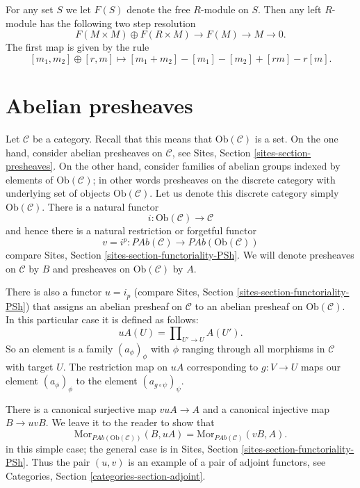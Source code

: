 \medskip\noindent
For any set $S$ we let $F(S)$ denote the free $R$-module on $S$.
Then any left $R$-module has the following two step resolution
$$
F(M\times M) \oplus F(R\times M) \to F(M) \to M \to 0.
$$
The first map is given by the rule
$$
[m_1, m_2] \oplus [r, m] \mapsto [m_1 + m_2] - [m_1] - [m_2] + [rm] - r[m].
$$


\section{Abelian presheaves}
\label{section-injectives-presheaves}

\noindent
Let $\mathcal{C}$ be a category. Recall that this means that
$\text{Ob}(\mathcal{C})$ is a set. On the one hand, consider abelian
presheaves on $\mathcal{C}$, see
Sites, Section \ref{sites-section-presheaves}.
On the other hand, consider families of abelian groups
indexed by elements of $\text{Ob}(\mathcal{C})$; in other
words presheaves on the discrete category with underlying set
of objects $\text{Ob}(\mathcal{C})$. Let us denote this
discrete category simply $\text{Ob}(\mathcal{C})$.
There is a natural functor
$$
i : \text{Ob}(\mathcal{C}) \longrightarrow \mathcal{C}
$$
and hence there is a natural restriction or forgetful functor
$$
v = i^p : 
\textit{PAb}(\mathcal{C})
\longrightarrow
\textit{PAb}(\text{Ob}(\mathcal{C}))
$$
compare Sites, Section \ref{sites-section-functoriality-PSh}.
We will denote presheaves
on $\mathcal{C}$ by $B$ and presheaves on
$\text{Ob}(\mathcal{C})$ by $A$.

\medskip\noindent
There is also a functor $u = i_p$ (compare
Sites, Section \ref{sites-section-functoriality-PSh})
that assigns an abelian presheaf on $\mathcal{C}$
to an abelian presheaf on $\text{Ob}(\mathcal{C})$.
In this particular case it is defined as follows:
$$
uA(U) = \prod\nolimits_{U' \to U} A(U').
$$
So an element is a family $(a_\phi)_\phi$ with $\phi$
ranging through all morphisms in $\mathcal{C}$ with target $U$.
The restriction map on $uA$ corresponding to $g : V \to U$
maps our element $(a_\phi)_\phi$ to the element 
$(a_{g \circ \psi})_\psi$. 

\medskip\noindent
There is a canonical surjective map $vuA \to A$ and a canonical
injective map $B \to uvB$. We leave it to the reader to show that
$$
\text{Mor}_{\textit{PAb}(\text{Ob}(\mathcal{C}))}(B, uA)
=
\text{Mor}_{\textit{PAb}(\mathcal{C})}(vB, A).
$$
in this simple case; the general case is in
Sites, Section \ref{sites-section-functoriality-PSh}.
Thus the pair $(u,v)$ is an example of a pair of adjoint
functors, see
Categories, Section \ref{categories-section-adjoint}.

